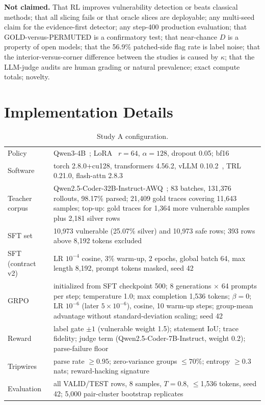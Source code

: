 \documentclass[journal]{IEEEtran}
\begin{document}
\textbf{Not claimed.} That RL improves vulnerability detection or beats classical methods; that all slicing fails or that oracle slices are deployable; any multi-seed claim for the evidence-first detector; any step-400 production evaluation; that GOLD-versus-PERMUTED is a confirmatory test; that near-chance $D$ is a property of open models; that the 56.9\% patched-side flag rate is label noise; that the interior-versus-corner difference between the studies is caused by $\kappa$; that the LLM-judge audits are human grading or natural prevalence; exact compute totals; novelty.

\section{Implementation Details}
\label{app:impl}
\begin{table}[!ht]
\centering\scriptsize\setlength{\tabcolsep}{3pt}
\caption{Study A configuration.}
\label{tab:implA}
\begin{tabular}{p{1.7cm}p{6.4cm}}
\toprule
Policy & Qwen3-4B~\cite{qwen3}; LoRA~\cite{lora} $r{=}64$, $\alpha{=}128$, dropout 0.05; bf16\\
Software & torch 2.8.0+cu128, transformers 4.56.2, vLLM 0.10.2~\cite{vllm}, TRL 0.21.0, flash-attn 2.8.3~\cite{flash2}\\
Teacher corpus & Qwen2.5-Coder-32B-Instruct-AWQ~\cite{qwencoder}; 83 batches, 131,376 rollouts, 98.17\% parsed; 21,409 gold traces covering 11,643 samples; top-up: gold traces for 1,364 more vulnerable samples plus 2,181 silver rows\\
SFT set & 10,973 vulnerable (25.07\% silver) and 10,973 safe rows; 393 rows above 8,192 tokens excluded\\
SFT (contract v2) & LR $10^{-4}$ cosine, 3\% warm-up, 2 epochs, global batch 64, max length 8,192, prompt tokens masked, seed 42\\
GRPO & initialized from SFT checkpoint 500; 8 generations $\times$ 64 prompts per step; temperature 1.0; max completion 1,536 tokens; $\beta{=}0$; LR $10^{-6}$ (later $5{\times}10^{-6}$), cosine, 10 warm-up steps; group-mean advantage without standard-deviation scaling; seed 42\\
Reward & label gate $\pm1$ (vulnerable weight 1.5); statement IoU; trace fidelity; judge term (Qwen2.5-Coder-7B-Instruct, weight 0.2); parse-failure floor\\
Tripwires & parse rate $\ge0.95$; zero-variance groups $\le70\%$; entropy $\ge0.3$ nats; reward-hacking signature\\
Evaluation & all VALID/TEST rows, 8 samples, $T{=}0.8$, $\le$1,536 tokens, seed 42; 5,000 pair-cluster bootstrap replicates\\
\bottomrule
\end{tabular}
\end{table}
\end{document}
